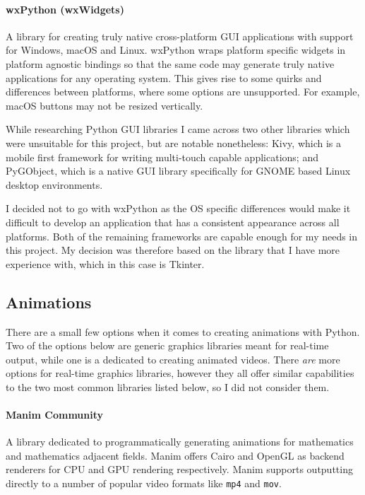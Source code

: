 \documentclass{report}
\begin{document}
\paragraph{wxPython (wxWidgets)}
A library for creating truly native cross-platform GUI applications with
support for Windows, macOS and Linux. wxPython wraps platform specific widgets
in platform agnostic bindings so that the same code may generate truly native
applications for any operating system. This gives rise to some quirks and
differences between platforms, where some options are unsupported. For example,
macOS buttons may not be resized vertically.
\vspace{3.25ex}

While researching Python GUI libraries I came across two other libraries which
were unsuitable for this project, but are notable nonetheless: Kivy, which is a
mobile first framework for writing multi-touch capable applications; and
PyGObject, which is a native GUI library specifically for GNOME based Linux
desktop environments.
\vspace{3.25ex}

I decided not to go with wxPython as the OS specific differences would make it
difficult to develop an application that has a consistent appearance across all
platforms. Both of the remaining frameworks are capable enough for my needs in
this project. My decision was therefore based on the library that I have more
experience with, which in this case is Tkinter.

\subsection{Animations}
There are a small few options when it comes to creating animations with Python.
Two of the options below are generic graphics libraries meant for real-time
output, while one is a dedicated to creating animated videos. There
\textit{are} more options for real-time graphics libraries, however they all
offer similar capabilities to the two most common libraries listed below, so I
did not consider them.

\paragraph{Manim Community}
A library dedicated to programmatically generating animations for mathematics
and mathematics adjacent fields. Manim offers Cairo and OpenGL as backend
renderers for CPU and GPU rendering respectively. Manim supports outputting
directly to a number of popular video formats like \texttt{mp4} and
\texttt{mov}.
\end{document}
